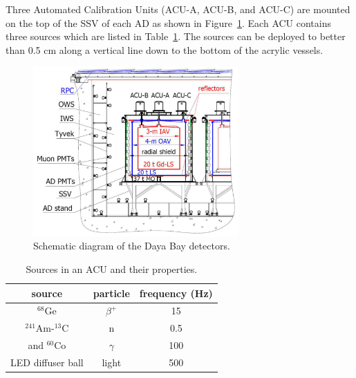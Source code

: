 Three Automated Calibration Units (ACU-A, ACU-B, and ACU-C) are mounted on the top of the SSV of each AD as shown in Figure~\ref{fig:dayabay_detectors}. Each ACU contains three sources which are listed in Table~\ref{table:ACU_sources}. The sources can be deployed to better than 0.5 cm along a vertical line down to the bottom of the acrylic vessels.
\begin{figure}
	\centering
	\includegraphics[width=0.7\textwidth]{figures/chap3/dayabay_detectors.eps}
	\caption{Schematic diagram of the Daya Bay detectors.}
	\label{fig:dayabay_detectors}
\end{figure}
\begin{table}
	\centering
	\begin{tabular}{ccc}
		\toprule
		source & particle & frequency (Hz) \\
		\midrule
		$^{68}$Ge & $\beta^+$ & 15 \\
		\hline
		$^{241}$Am-$^{13}$C & n & 0.5 \\
		and $^{60}$Co & $\gamma$ & 100 \\
		\hline
		LED diffuser ball & light & 500 \\
		\bottomrule	
	\end{tabular}
	\caption{Sources in an ACU and their properties.}
	\label{table:ACU_sources}
\end{table}

